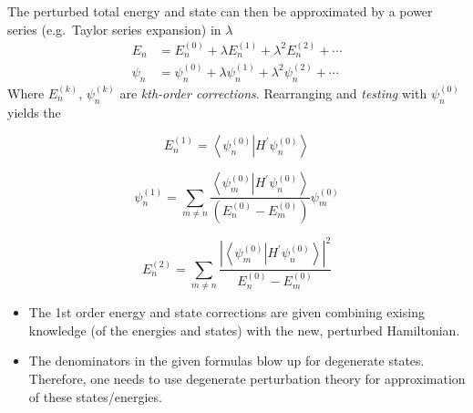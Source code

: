 The perturbed total energy and state can then be approximated by a power series (e.g.\ Taylor series expansion) in $\lambda$
\begin{align*}
    E_{n}    & =E_{n}^{(0)}+\lambda E_{n}^{(1)}+\lambda^{2}E_{n}^{(2)}+\cdots         \\
    \psi_{n} & =\psi_{n}^{(0)}+\lambda\psi_{n}^{(1)}+\lambda^{2}\psi_{n}^{(2)}+\cdots
\end{align*}
Where $E_{n}^{(k)}$, $\psi_{n}^{(k)}$ are \textit{kth-order  corrections}. Rearranging and \textit{testing} with $\psi_{n}^{(0)}$ yields the

\newpar{}
\begin{equation*}
    E_{n}^{(1)}=\left\langle\psi_{n}^{(0)}\right| H^{\prime} \left.\psi_{n}^{(0)}\right\rangle
\end{equation*}

\begin{equation*}
    \psi_{n}^{(1)}=\sum_{m\neq n}\frac{\left\langle\psi_{m}^{(0)}\right|H^{\prime}\left.\psi_{n}^{(0)}\right\rangle}{\left(E_{n}^{(0)}-E_{m}^{(0)}\right)}\psi_{m}^{(0)}
\end{equation*}

\begin{equation*}
    E_{n}^{(2)}=\sum_{m\neq n}\frac{\left|\left\langle\psi_{m}^{(0)}\right|H^{\prime}\left.\psi_{n}^{(0)}\right\rangle\right|^{2}}{E_{n}^{(0)}-E_{m}^{(0)}}
\end{equation*}

\newpar{}
\begin{itemize}
    \item The 1st order energy and state corrections are given combining exising knowledge (of the energies and states) with the new, perturbed Hamiltonian.
    \item The denominators in the given formulas blow up for degenerate states. Therefore, one needs to use degenerate perturbation theory for approximation of these states/energies.
\end{itemize}

